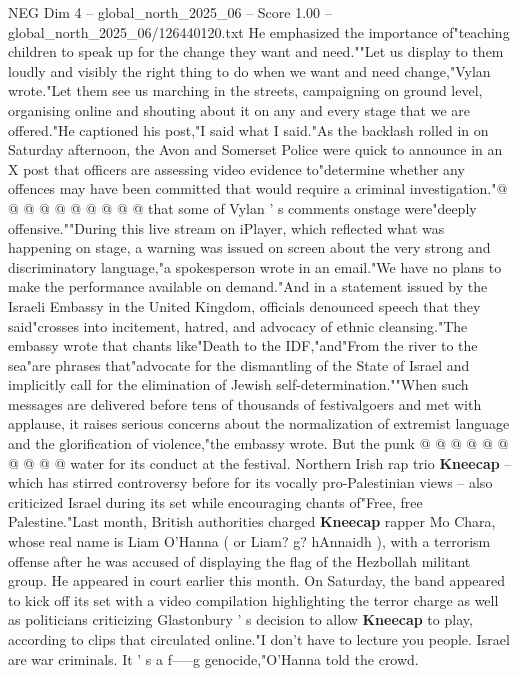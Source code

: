 \begin{textsample}{NEG Dim 4 – global\_north\_2025\_06 – Score 1.00 – global\_north\_2025\_06/126440120.txt}
He emphasized the importance of"teaching children to speak up for the change they want and need.""Let us display to them loudly and visibly the right thing to do when we want and need change,"Vylan wrote."Let them see us marching in the streets, campaigning on ground level, organising online and shouting about it on any and every stage that we are offered."He captioned his post,"I said what I said."As the backlash rolled in on Saturday afternoon, the Avon and Somerset Police were quick to announce in an X post that officers are assessing video evidence to"determine whether any offences may have been committed that would require a criminal investigation."@ @ @ @ @ @ @ @ @ @ that some of Vylan ' s comments onstage were"deeply offensive.""During this live stream on iPlayer, which reflected what was happening on stage, a warning was issued on screen about the very strong and discriminatory language,"a spokesperson wrote in an email."We have no plans to make the performance available on demand."And in a statement issued by the Israeli Embassy in the United Kingdom, officials denounced speech that they said"crosses into incitement, hatred, and advocacy of ethnic cleansing."The embassy wrote that chants like"Death to the IDF,"and"From the river to the sea"are phrases that"advocate for the dismantling of the State of Israel and implicitly call for the elimination of Jewish self-determination.""When such messages are delivered before tens of thousands of festivalgoers and met with applause, it raises serious concerns about the normalization of extremist language and the glorification of violence,"the embassy wrote.
But the punk @ @ @ @ @ @ @ @ @ @ water for its conduct at the festival.
Northern Irish rap trio \textbf{Kneecap} -- which has stirred controversy before for its vocally pro-Palestinian views -- also criticized Israel during its set while encouraging chants of"Free, free Palestine."Last month, British authorities charged \textbf{Kneecap} rapper Mo Chara, whose real name is Liam O'Hanna ( or Liam? g? hAnnaidh ), with a terrorism offense after he was accused of displaying the flag of the Hezbollah militant group.
He appeared in court earlier this month.
On Saturday, the band appeared to kick off its set with a video compilation highlighting the terror charge as well as politicians criticizing Glastonbury ' s decision to allow \textbf{Kneecap} to play, according to clips that circulated online."I don't have to lecture you people.
Israel are war criminals.
It ' s a f-----g genocide,"O'Hanna told the crowd.

\end{textsample}
